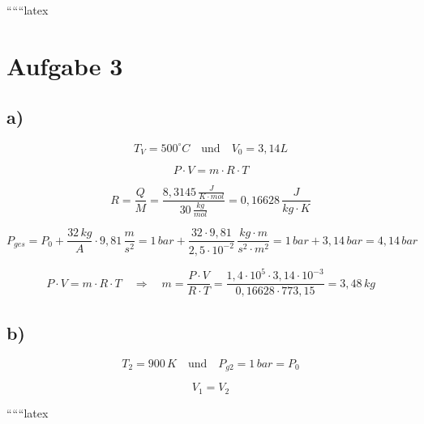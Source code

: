 
``````latex


\section*{Aufgabe 3}

\subsection*{a)}

\[
T_V = 500^\circ C \quad \text{und} \quad V_0 = 3,14 L
\]

\[
P \cdot V = m \cdot R \cdot T
\]

\[
R = \frac{Q}{M} = \frac{8,3145 \, \frac{J}{K \cdot mol}}{30 \, \frac{kg}{mol}} = 0,16628 \, \frac{J}{kg \cdot K}
\]

\[
P_{ges} = P_0 + \frac{32 \, kg}{A} \cdot 9,81 \, \frac{m}{s^2} = 1 \, bar + \frac{32 \cdot 9,81}{2,5 \cdot 10^{-2}} \, \frac{kg \cdot m}{s^2 \cdot m^2} = 1 \, bar + 3,14 \, bar = 4,14 \, bar
\]

\[
P \cdot V = m \cdot R \cdot T \quad \Rightarrow \quad m = \frac{P \cdot V}{R \cdot T} = \frac{1,4 \cdot 10^5 \cdot 3,14 \cdot 10^{-3}}{0,16628 \cdot 773,15} = 3,48 \, kg
\]

\subsection*{b)}

\[
T_2 = 900 \, K \quad \text{und} \quad P_{g2} = 1 \, bar = P_0
\]

\[
V_1 = V_2
\]

``````latex


